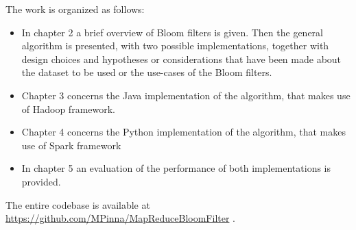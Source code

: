 The work is organized as follows:
\begin{itemize}
	\item In chapter 2 a brief overview of Bloom filters is given. Then the general algorithm is presented, with two possible implementations, together with design choices and hypotheses or considerations that have been made about the dataset to be used or the use-cases of the Bloom filters.
	\item Chapter 3 concerns the Java implementation of the algorithm, that makes use of Hadoop framework.
	\item Chapter 4 concerns the Python implementation of the algorithm, that makes use of Spark framework
	\item In chapter 5 an evaluation of the performance of both implementations is provided.
\end{itemize}
\hfill \break
The entire codebase is available at\\
\url{https://github.com/MPinna/MapReduceBloomFilter} .
